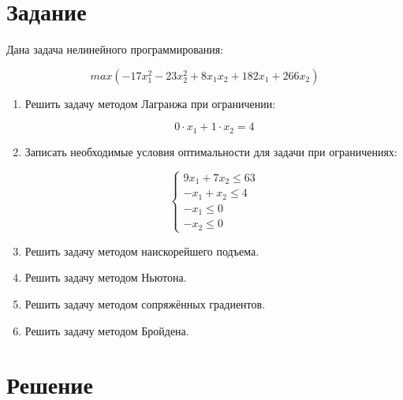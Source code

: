 





\section{Задание}

Дана задача нелинейного программирования:

\begin{equation}
\label{eq:target}
	max \left( -17 x^2_1 - 23 x^2_2 + 8 x_1 x_2 + 182 x_1 + 266 x_2 \right)
\end{equation}

\begin{enumerate}

	\item Решить задачу методом Лагранжа при ограничении: 
	
		\begin{equation}
		\label{eq:lagrange-constraints}
			0 \cdot x_1 + 1 \cdot x_2 = 4
		\end{equation}
	
	\item Записать необходимые условия оптимальности для задачи при ограничениях:
	
		\begin{equation}
		\label{eq:bil-constraints}
			\begin{cases}
				9 x_1 + 7 x_2 \leq 63
				\\
				-x_1 + x_2 \leq 4
				\\
				-x_1 \leq 0
				\\
				-x_2 \leq 0
			\end{cases}
		\end{equation}
	
	\item Решить задачу методом наискорейшего подъема.
	
	\item Решить задачу методом Ньютона.	
	
	\item Решить задачу методом сопряжённых градиентов.

	\item Решить задачу методом Бройдена.

\end{enumerate}

\section{Решение}

